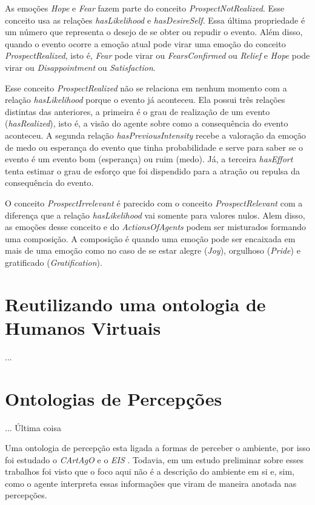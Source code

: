 As emoções \emph{Hope} e \emph{Fear} fazem parte do conceito
\emph{ProspectNotRealized}. Esse conceito usa as relações \emph{hasLikelihood}
e \emph{hasDesireSelf}. Essa última propriedade é um número que
representa o desejo de se obter ou repudir o evento. Além disso, quando o
evento ocorre a emoção atual pode virar uma emoção do conceito
\emph{ProspectRealized}, isto é, \emph{Fear} pode virar ou
\emph{FearsConfirmed} ou \emph{Relief} e \emph{Hope} pode virar ou
\emph{Disappointment} ou \emph{Satisfaction}.

Esse conceito \emph{ProspectRealized} não se relaciona em nenhum momento com a
relação \emph{hasLikelihood} porque o evento já aconteceu. Ela possui três
relações distintas das anteriores, a primeira é o grau de realização de um evento
(\emph{hasRealized}), isto é, a visão do agente sobre como a consequência do
evento aconteceu. A segunda relação \emph{hasPreviousIntensity} recebe a
valoração da emoção de medo ou esperança do evento que tinha probabilidade e
serve para saber se o evento é um evento bom (esperança) ou ruim (medo). Já, a
terceira \emph{hasEffort} tenta estimar o grau de esforço que foi dispendido
para a atração ou repulsa da consequência do evento.

O conceito \emph{ProspectIrrelevant} é parecido com o conceito
\emph{ProspectRelevant} com a diferença que a relação \emph{hasLikelihood} vai
somente para valores nulos. Alem disso, as emoções desse conceito e do
\emph{ActionsOfAgents} podem ser misturados formando uma composição. A
composição é quando uma emoção pode ser encaixada em mais de uma emoção como
no caso de se estar alegre (\emph{Joy}), orgulhoso (\emph{Pride}) e
gratificado (\emph{Gratification}).

\section{Reutilizando uma ontologia de Humanos Virtuais} \label{cap:tp:ruodhv}

...

\section{Ontologias de Percepções} \label{cap:tp:odp}

... Última coisa

Uma ontologia de percepção esta ligada a formas de perceber o ambiente, por
isso foi estudado o \emph{CArtAgO} e o \emph{EIS}
. Todavia, em um estudo preliminar sobre esses trabalhos foi
visto que o foco aqui não é a descrição do ambiente em si e, sim, como o
agente interpreta essas informações que viram de maneira anotada nas
percepções\dev{}.

